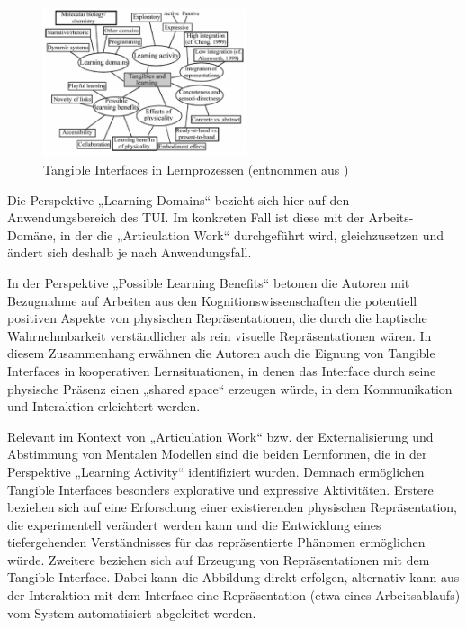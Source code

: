 \begin{figure}[htbp]
	\centering
		\includegraphics[width=6cm]{img/ImplementierungUeberblick/marshall_tui_learning.png}
	\caption[Tangible Interfaces in Lernprozessen]{Tangible Interfaces in Lernprozessen (entnommen aus \citet{Marshall07})}
	\label{fig:img_ImplementierungUeberblick_marshall_tui_learning}
\end{figure}

Die Perspektive „Learning Domains“ bezieht sich hier auf den Anwendungsbereich des \gls{TUI}. Im konkreten Fall ist diese mit der Arbeits-Domäne, in der die „Articulation Work“ durchgeführt wird, gleichzusetzen und ändert sich deshalb je nach Anwendungsfall.

In der Perspektive „Possible Learning Benefits“ betonen die Autoren mit Bezugnahme auf Arbeiten aus den Kognitionswissenschaften die potentiell positiven Aspekte von physischen Repräsentationen, die durch die haptische Wahrnehmbarkeit verständlicher als rein visuelle Repräsentationen wären. In diesem Zusammenhang erwähnen die Autoren auch die Eignung von Tangible Interfaces in kooperativen Lernsituationen, in denen das Interface durch seine physische Präsenz einen „shared space“ erzeugen würde, in dem Kommunikation und Interaktion erleichtert werden.

Relevant im Kontext von „Articulation Work“ bzw. der Externalisierung und Abstimmung von Mentalen Modellen sind die beiden Lernformen, die in der Perspektive „Learning Activity“ identifiziert wurden. Demnach ermöglichen Tangible Interfaces besonders explorative und expressive Aktivitäten. Erstere beziehen sich auf eine Erforschung einer existierenden physischen Repräsentation, die experimentell verändert werden kann und die Entwicklung eines tiefergehenden Verständnisses für das repräsentierte Phänomen ermöglichen würde. Zweitere beziehen sich auf Erzeugung von Repräsentationen mit dem Tangible Interface. Dabei kann die Abbildung direkt erfolgen, alternativ kann aus der Interaktion mit dem Interface eine Repräsentation (etwa eines Arbeitsablaufs) vom System automatisiert abgeleitet werden.

